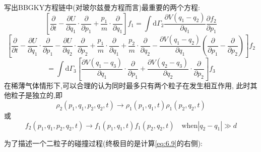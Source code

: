     写出BBGKY方程链中(对玻尔兹曼方程而言)最重要的两个方程:
    \begin{equation}
      \left[ \dfrac{\partial }{\partial t}-\dfrac{\partial U}{\partial q_1}\cdot \dfrac{\partial }{\partial p_1} + \frac{p_1}{m}\cdot \dfrac{\partial }{\partial q_1} \right] f_1=\int \mathrm{d} \Gamma_2 \dfrac{\partial V(q_1-q_2)}{\partial q_1} \dfrac{\partial f_2}{\partial p_1}
      \label{eq:6.9}
    \end{equation}
    \[
      \left[ \dfrac{\partial }{\partial t}-\dfrac{\partial U}{\partial q_1}\cdot \dfrac{\partial }{\partial p_1}-\dfrac{\partial U}{\partial q_2}\cdot \dfrac{\partial }{\partial p_2}+\frac{p_1}{m} \cdot \dfrac{\partial }{\partial q_1}+\frac{p_2}{m} \cdot \dfrac{\partial }{\partial q_2}-\dfrac{\partial V(q_1-q_2)}{\partial q_1}(\dfrac{\partial }{\partial p_1}-\dfrac{\partial }{\partial p_2}) \right] f_2
    \]
    \begin{equation}
      =\int \mathrm{d} \Gamma_3 \left[ \dfrac{\partial V(q_1-q_3)}{\partial q_1} \cdot \dfrac{\partial }{\partial p_1}+ \dfrac{\partial V(q_2-q_3)}{\partial q_2} \cdot \dfrac{\partial }{\partial p_2} \right] f_3
    \end{equation}
    在稀薄气体情形下,可以合理的认为同时最多只有两个粒子在发生相互作用, 此时其他粒子是独立的,即 
    \[\rho_2(p_1,q_1,p_2,q_2,t) \to  \rho_1(p_1,q_1,t)\rho_1(p_2,q_2,t)\]
    或
    \[f_2(p_1,q_1,p_2,q_2,t) \to  f_1(p_1,q_1,t)f_1(p_2,q_2,t) \quad \text{when}\left\vert q_2-q_1 \right\vert \gg d\]

    为了描述一个二粒子的碰撞过程(终极目的是计算\eqref{eq:6.9}的右侧):

